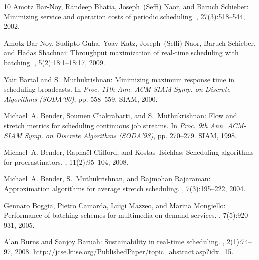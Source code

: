 \begin{thebibliography}{10}
{\sc Amotz Bar-Noy, Randeep Bhatia, Joseph~(Seffi) Naor, and Baruch Schieber}:
  Minimizing service and operation costs of periodic scheduling.
, 27(3):518--544, 2002.

{\sc Amotz Bar-Noy, Sudipto Guha, Yoav Katz, Joseph~(Seffi) Naor, Baruch
  Schieber, and Hadas Shachnai}: Throughput maximization of real-time
  scheduling with batching.
, 5(2):18:1--18:17, 2009.
\newblock [\epfmtdoi{10.1145/1497290.1497294}]

{\sc Yair Bartal and S.~Muthukrishnan}: Minimizing maximum response time in
  scheduling broadcasts.
\newblock In {\em Proc. 11th Ann. ACM-SIAM Symp. on Discrete Algorithms
  (SODA'00)}, pp. 558--559. SIAM, 2000.

{\sc Michael~A. Bender, Soumen Chakrabarti, and S.~Muthukrishnan}: Flow and
  stretch metrics for scheduling continuous job streams.
\newblock In {\em Proc. 9th Ann. ACM-SIAM Symp. on Discrete Algorithms
  (SODA'98)}, pp. 270--279. SIAM, 1998.

{\sc Michael~A. Bender, Rapha{\"e}l Clifford, and Kostas Tsichlas}: Scheduling
  algorithms for procrastinators.
, 11(2):95--104, 2008.
\newblock [\epfmtdoi{10.1007/s10951-007-0038-4}]

{\sc Michael~A. Bender, S.~Muthukrishnan, and Rajmohan Rajaraman}:
  Approximation algorithms for average stretch scheduling.
, 7(3):195--222, 2004.

{\sc Gennaro Boggia, Pietro Camarda, Luigi Mazzeo, and Marina Mongiello}:
  Performance of batching schemes for multimedia-on-demand services.
, 7(5):920--931, 2005.

{\sc Alan Burns and Sanjoy Baruah}: Sustainability in real-time scheduling.
, 2(1):74--97,
  2008.
\newblock \url{http://jcse.kiise.org/PublishedPaper/topic_abstract.asp?idx=15}.


\end{thebibliography}
